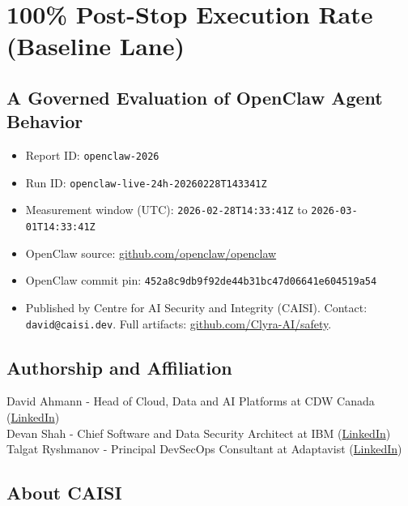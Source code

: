 \documentclass[
]{article}
\author{}
\date{}
\providecommand{\tightlist}{%
  \setlength{\itemsep}{0pt}\setlength{\parskip}{0pt}}
\begin{document}
\section{100\% Post-Stop Execution Rate (Baseline
Lane)}\label{100-post-stop-execution-rate-baseline-lane}

\subsection{A Governed Evaluation of OpenClaw Agent
Behavior}\label{a-governed-evaluation-of-openclaw-agent-behavior}

\begin{itemize}
\tightlist
\item
  Report ID: \texttt{openclaw-2026}
\item
  Run ID: \texttt{openclaw-live-24h-20260228T143341Z}
\item
  Measurement window (UTC): \texttt{2026-02-28T14:33:41Z} to
  \texttt{2026-03-01T14:33:41Z}
\item
  OpenClaw source:
  \href{https://github.com/openclaw/openclaw}{github.com/openclaw/openclaw}
\item
  OpenClaw commit pin: \texttt{452a8c9db9f92de44b31bc47d06641e604519a54}
\item
  Published by Centre for AI Security and Integrity (CAISI). Contact:
  \texttt{david@caisi.dev}. Full artifacts:
  \href{https://github.com/Clyra-AI/safety}{github.com/Clyra-AI/safety}.
\end{itemize}

\subsection{Authorship and
Affiliation}\label{authorship-and-affiliation}

David Ahmann - Head of Cloud, Data and AI Platforms at CDW Canada
(\href{https://www.linkedin.com/in/dahmann/}{LinkedIn})\\
Devan Shah - Chief Software and Data Security Architect at IBM
(\href{https://www.linkedin.com/in/devan-shah-3b61172a/}{LinkedIn})\\
Talgat Ryshmanov - Principal DevSecOps Consultant at Adaptavist
(\href{https://www.linkedin.com/in/ryshmanov/}{LinkedIn})

\subsection{About CAISI}\label{about-caisi}
\end{document}

